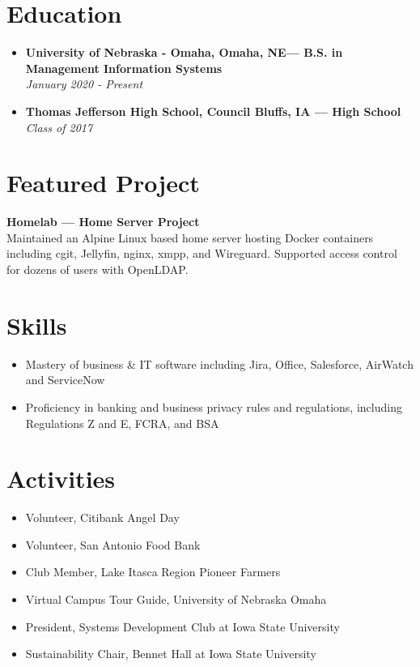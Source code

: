 \documentclass[letterpaper,9pt]{article}
\begin{document}
\section*{Education}
\begin{itemize}
\item[] \textbf{University of Nebraska - Omaha, Omaha, NE— B.S. in Management Information Systems} \\
\textit{January 2020 - Present}

\item[] \textbf{Thomas Jefferson High School, Council Bluffs, IA — High School} \\
\textit{Class of 2017}
\end{itemize}

\section*{Featured Project}
\textbf{Homelab — Home Server Project} \\
Maintained an Alpine Linux based home server hosting Docker containers including cgit, Jellyfin, nginx, xmpp, and Wireguard. Supported access control for dozens of users with OpenLDAP.

\section*{Skills}
\begin{itemize}
    \item Mastery of business \& IT software including Jira, Office, Salesforce, AirWatch and ServiceNow
    \item Proficiency in banking and business privacy rules and regulations, including Regulations Z and E, FCRA, and BSA
\end{itemize}

\section*{Activities}
\begin{itemize}
    \item Volunteer, Citibank Angel Day
    \item Volunteer, San Antonio Food Bank
    \item Club Member, Lake Itasca Region Pioneer Farmers
    \item Virtual Campus Tour Guide, University of Nebraska Omaha
    \item President, Systems Development Club at Iowa State University
    \item Sustainability Chair, Bennet Hall at Iowa State University
\end{itemize}
\end{document}
